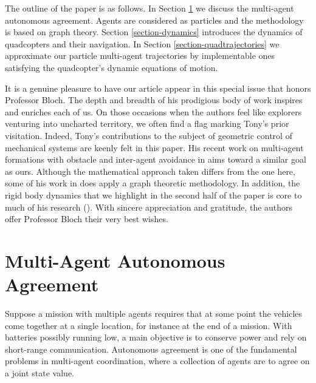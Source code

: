\documentclass{aims}
\theoremstyle{definition}
\begin{document}
The outline of the paper is as follows. In Section \ref{section multi-agents} we discuss the multi-agent autonomous agreement. Agents are considered as particles and the methodology is based on graph theory. Section \ref{section-dynamics} introduces the dynamics of quadcopters and their navigation. In Section \ref{section-quadtrajectories} we approximate our particle multi-agent trajectories by implementable ones satisfying the quadcopter's dynamic equations of motion. 

It is a genuine pleasure to have our article appear in this special issue that honors Professor Bloch. The depth and breadth of his prodigious body of work inspires and enriches each of us. On those occasions when the authors feel like explorers venturing into uncharted territory, we often find a flag marking Tony's prior visitation. Indeed, Tony's contributions to the subject of geometric control of mechanical systems are keenly felt in this paper. His recent work on multi-agent formations with obstacle and inter-agent avoidance in \cite{VarCollision} aims toward a similar goal as ours. Although the mathematical approach taken differs from the one here, some of his work in \cite{QuantLind} does apply a graph theoretic methodology.  %
In addition, the rigid body dynamics that we highlight in the second half of the paper is core to much of his research (\cite{Bloch book,Bloch1,GeomStructPreser,PlanarMotGrav}). With sincere appreciation and gratitude, the authors offer Professor Bloch their very best wishes.



\newpage
\section{Multi-Agent Autonomous Agreement}
\label{section multi-agents}
Suppose a mission with multiple agents requires that at some point the vehicles come together at a single location, for instance at the end of a mission.  With batteries possibly running low, a main objective is to conserve power and rely on short-range communication. Autonomous agreement is one of the fundamental problems in multi-agent coordination,
where a collection of agents are to agree on a joint state value.
\end{document}
